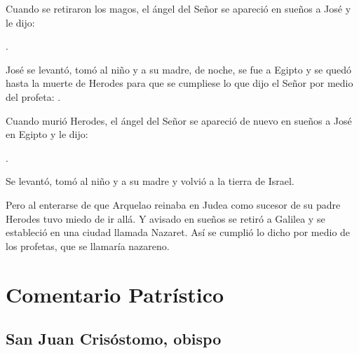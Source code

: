 		\begin{scripture}
			Cuando se retiraron los magos, el ángel del Señor se apareció en sueños a José y le dijo:
			
			.
			
			José se levantó, tomó al niño y a su madre, de noche, se fue a Egipto y se quedó hasta la muerte de Herodes para que se cumpliese lo que dijo el Señor por medio del profeta: .
			
			Cuando murió Herodes, el ángel del Señor se apareció de nuevo en sueños a José en Egipto y le dijo:
			
			.
			
			Se levantó, tomó al niño y a su madre y volvió a la tierra de Israel.
			
			Pero al enterarse de que Arquelao reinaba en Judea como sucesor de su padre Herodes tuvo miedo de ir allá. Y avisado en sueños se retiró a Galilea y se estableció en una ciudad llamada Nazaret. Así se cumplió lo dicho por medio de los profetas, que se llamaría nazareno.
		\end{scripture}


\newsection


	\section{Comentario Patrístico}

		\subsection{San Juan Crisóstomo, obispo}
		
			
			
